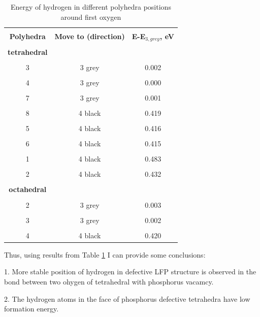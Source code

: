 \documentclass[11pt]{article}
\begin{document}
\begin{table}[H]
\scriptsize{
\caption{Energy of hydrogen in different polyhedra positions around first oxygen}
\label{energy1}
\begin{center}
\begin{tabular}{|c|c|c|}
\hline
& & \\
 \textbf{Polyhedra} & \textbf{Move to (direction)} & \textbf{E-E$_{3,grey}$, eV}\\ 
\hline
& & \\
 \textbf{tetrahedral}  &  & \\ 
\hline
& & \\
3 & 3 grey & 0.002 \\
\hline
& & \\
4 & 3 grey & 0.000 \\
\hline
& & \\
7 & 3 grey & 0.001 \\
\hline
& & \\
8 & 4 black & 0.419 \\
\hline
& &\\
5 & 4 black & 0.416 \\
\hline
& & \\
6 & 4 black & 0.415 \\
\hline
& &\\
1 & 4 black & 0.483 \\
\hline
& &\\
2 & 4 black & 0.432 \\
\hline
& &\\
\textbf{octahedral} & & \\
\hline
& & \\
2 & 3 grey & 0.003 \\
\hline
& &  \\
3 & 3 grey & 0.002 \\
\hline
& & \\
4 & 4 black & 0.420 \\
\hline
\end{tabular}
\end{center}
}
\end{table}

Thus, using results from Table \ref{energy1} I can provide some conclusions:

1. More stable position of hydrogen in defective LFP structure is observed in the bond between two ohygen of tetrahedral with phosphorus vacamcy.

2. The hydrogen atoms in the face of phosphorus defective tetrahedra have low formation energy.
\end{document}
